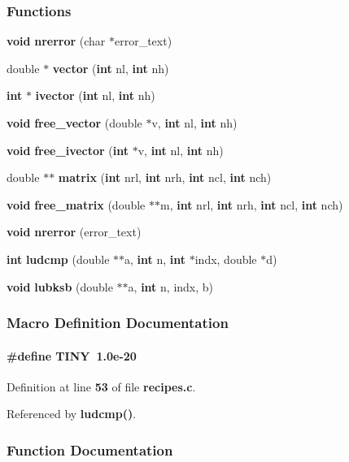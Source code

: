 \subsubsection*{Functions}
\begin{DoxyCompactItemize}
\item 
{\bf void} {\bf nrerror} (char $\ast$error\+\_\+text)
\item 
double $\ast$ {\bf vector} ({\bf int} nl, {\bf int} nh)
\item 
{\bf int} $\ast$ {\bf ivector} ({\bf int} nl, {\bf int} nh)
\item 
{\bf void} {\bf free\+\_\+vector} (double $\ast$v, {\bf int} nl, {\bf int} nh)
\item 
{\bf void} {\bf free\+\_\+ivector} ({\bf int} $\ast$v, {\bf int} nl, {\bf int} nh)
\item 
double $\ast$$\ast$ {\bf matrix} ({\bf int} nrl, {\bf int} nrh, {\bf int} ncl, {\bf int} nch)
\item 
{\bf void} {\bf free\+\_\+matrix} (double $\ast$$\ast$m, {\bf int} nrl, {\bf int} nrh, {\bf int} ncl, {\bf int} nch)
\item 
{\bf void} {\bf nrerror} (error\+\_\+text)
\item 
{\bf int} {\bf ludcmp} (double $\ast$$\ast$a, {\bf int} n, {\bf int} $\ast$indx, double $\ast$d)
\item 
{\bf void} {\bf lubksb} (double $\ast$$\ast$a, {\bf int} n, indx, b)
\end{DoxyCompactItemize}


\subsubsection{Macro Definition Documentation}
\paragraph[{T\+I\+NY}]{\setlength{\rightskip}{0pt plus 5cm}\#define T\+I\+NY~1.\+0e-\/20}\label{recipes_8c_acf1c38f71f39386356edb151a131ad11}


Definition at line {\bf 53} of file {\bf recipes.\+c}.



Referenced by {\bf ludcmp()}.



\subsubsection{Function Documentation}
